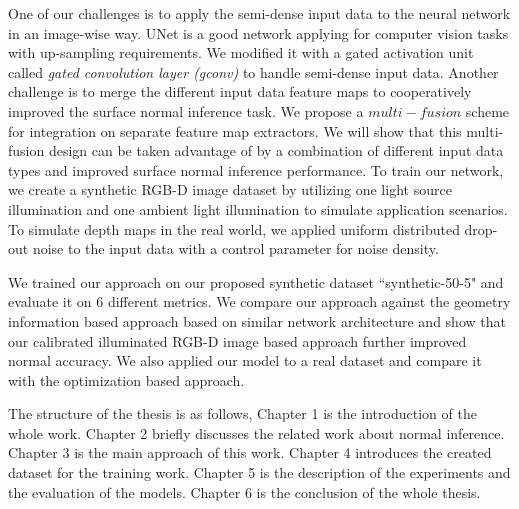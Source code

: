 One of our challenges is to apply the semi-dense input data to the neural network in an image-wise way. UNet is a good network applying for computer vision tasks with up-sampling requirements. We modified it with a gated activation unit called \textit{gated convolution layer (gconv)} to handle semi-dense input data. Another challenge is to merge the different input data feature maps to cooperatively improved the surface normal inference task. We propose a $ multi-fusion $ scheme for integration on separate feature map extractors. We will show that this multi-fusion design can be taken advantage of by a combination of different input data types and improved surface normal inference performance. To train our network, we create a synthetic RGB-D image dataset by utilizing one light source illumination and one ambient light illumination to simulate application scenarios. To simulate depth maps in the real world, we applied uniform distributed drop-out noise to the input data with a control parameter for noise density.

We trained our approach on our proposed synthetic dataset ``synthetic-50-5" and evaluate it on 6 different metrics. We compare our approach against the geometry information based approach based on similar network architecture and show that our calibrated illuminated RGB-D image based approach further improved normal accuracy. We also applied our model to a real dataset and compare it with the optimization based approach.

The structure of the thesis is as follows, Chapter 1 is the introduction of the whole work. Chapter 2 briefly discusses the related work about normal inference. Chapter 3 is the main approach of this work. Chapter 4 introduces the created dataset for the training work. Chapter 5 is the description of the experiments and the evaluation of the models. Chapter 6 is the conclusion of the whole thesis.


